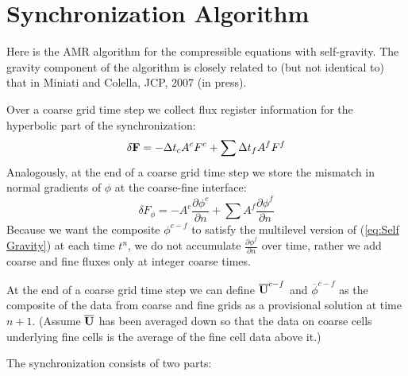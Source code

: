 \section{Synchronization Algorithm}

Here is the AMR algorithm for the compressible equations with
self-gravity.  The gravity component of the algorithm is closely
related to (but not identical to) that in Miniati and Colella, JCP,
2007 (in press).

Over a coarse grid time step we collect flux register information for
the hyperbolic part of the synchronization:
\begin{equation}
\delta{\bf F} = -\Delta t_c A^c F^c + \sum \Delta t_f A^f F^f
\end{equation}
Analogously, at the end of a coarse grid time step we store the
mismatch in normal gradients of $\phi$ at the coarse-fine interface:
\begin{equation}
\delta F_\phi =  - A^c \frac{\partial \phi^c}{\partial n}
+ \sum A^f \frac{\partial \phi^f}{\partial n}
\end{equation}
Because we want the composite $\phi^{c-f}$ to satisfy the multilevel
version of (\ref{eq:Self Gravity}) at each time $t^n$, we do not
accumulate $\frac{\partial \phi^f}{\partial n}$ over time, rather we
add coarse and fine fluxes only at integer coarse times.

At the end of a coarse grid time step we can define
${\overline{{\bf U}}}^{c-f}$ and $\overline{\phi}^{c-f}$ as the composite
of the data from coarse and fine grids as a provisional solution at
time $n+1$. (Assume $\overline{{\bf U}}$ has been averaged down so that
the data on coarse cells underlying fine cells is the average of the
fine cell data above it.)

The synchronization consists of two parts: 

